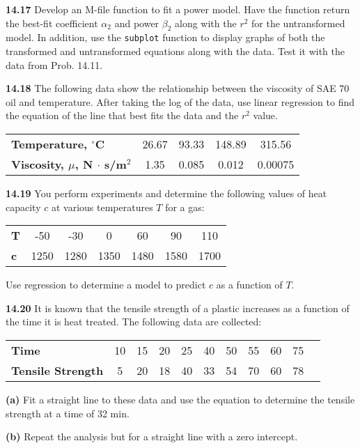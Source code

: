 \documentclass[../main.tex]{subfiles}
\begin{document}
\begin{multicols}{2}
	\noindent\textbf{14.17} Develop an M-file function to fit a power model.
	Have the function return the best-fit coefficient $\alpha_2$ and
	power $\beta_2$ along with the $r^2$ for the untransformed model. In
	addition, use the \texttt{subplot} function to display graphs of both
	the transformed and untransformed equations along with the
	data. Test it with the data from Prob. 14.11.

	\noindent\textbf{14.18} The following data show the relationship between the
	viscosity of SAE 70 oil and temperature. After taking the log
	of the data, use linear regression to find the equation of the
	line that best fits the data and the $r^2$ value.

	\noindent \begin{tabular}{l c c c c}
		\textbf{Temperature, $^\circ$C} & 26.67 & 93.33 & 148.89 & 315.56 \\
		\textbf{Viscosity, $\mu$, N $\cdot$ s/m$^2$} & 1.35 & 0.085 & 0.012 & 0.00075
  	\end{tabular}

	\noindent\textbf{14.19} You perform experiments and determine the following values of heat capacity $c$ at various temperatures $T$ for a gas:

	\noindent \begin{tabular}{l c c c c c c}
		\textbf{T} & -50 & -30 & 0 & 60 & 90 & 110 \\
		\textbf{c} & 1250 & 1280 & 1350 & 1480 & 1580 & 1700
  	\end{tabular}

	\noindent Use regression to determine a model to predict $c$ as a function of $T$.

	\noindent\textbf{14.20} It is known that the tensile strength of a plastic increases as a function of the time it is heat treated. The following data are collected:

	\noindent \begin{tabular}{l c c c c c c c c c c}
		\textbf{Time} & 10 & 15 & 20 & 25 & 40 & 50 & 55 & 60 & 75 \\
		\textbf{Tensile Strength} & 5 & 20 & 18 & 40 & 33 & 54 & 70 & 60 & 78
  	\end{tabular}

	\noindent \textbf{(a)} Fit a straight line to these data and use the equation to
	determine the tensile strength at a time of 32 min.


	\noindent \textbf{(b)} Repeat the analysis but for a straight line with a zero
	intercept.


\end{multicols}
\end{document}
